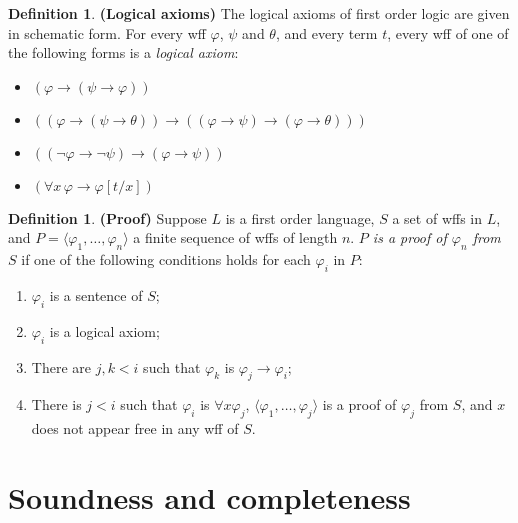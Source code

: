 \documentclass[10pt, a4paper, oneside]{article}
\theoremstyle{definition}
\newtheorem{dfn}[thm]{Definition}
\theoremstyle{remark}
\theoremstyle{plain}
\begin{document}
\begin{dfn}
    \textbf{(Logical axioms)}
    The logical axioms of first order logic are given in schematic form. For
    every wff $\varphi$, $\psi$ and $\theta$, and every term $t$, every wff of
    one of the following forms is a \emph{logical axiom}:
    
    \begin{itemize}
        \item $(\varphi \rightarrow (\psi \rightarrow \varphi))$
        \item $( (\varphi \rightarrow (\psi \rightarrow \theta))
              \rightarrow
              ( (\varphi \rightarrow \psi)
                \rightarrow
                (\varphi \rightarrow \theta) ) )$
        \item $( (\neg\varphi \rightarrow \neg\psi)
                 \rightarrow
                 (\varphi \rightarrow \psi) )$
        \item $(\forall{x} \, \varphi \rightarrow \varphi[t / x])$
    \end{itemize}
\end{dfn}

\begin{dfn}
    \textbf{(Proof)}
    Suppose $L$ is a first order language, $S$ a set of wffs in $L$, and $P =
    \langle \varphi_1, \dotsc, \varphi_n \rangle$ a finite sequence of wffs of
    length $n$. \emph{$P$ is a proof of $\varphi_n$ from $S$} if one of the
    following conditions holds for each $\varphi_i$ in $P$:
    
    \begin{enumerate}
        \item $\varphi_i$ is a sentence of $S$;
        \item $\varphi_i$ is a logical axiom;
        \item There are $j, k < i$ such that $\varphi_k$ is $\varphi_j
              \rightarrow \varphi_i$;
        \item There is $j < i$ such that $\varphi_i$ is $\forall{x}\varphi_j$,
            $\langle \varphi_1, \dotsc, \varphi_j \rangle$ is a proof of
            $\varphi_j$ from $S$, and $x$ does not appear free in any wff of
            $S$.
    \end{enumerate}
\end{dfn}

\section{Soundness and completeness}
\end{document}
